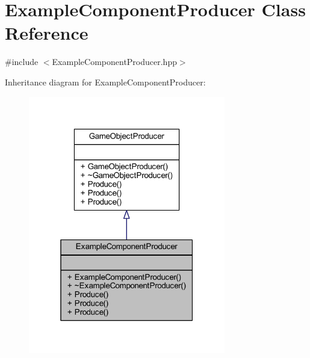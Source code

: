 \hypertarget{class_example_component_producer}{\section{Example\-Component\-Producer Class Reference}
\label{class_example_component_producer}
}


{\ttfamily \#include $<$Example\-Component\-Producer.\-hpp$>$}



Inheritance diagram for Example\-Component\-Producer\-:\nopagebreak
\begin{figure}[H]
\begin{center}
\leavevmode
\includegraphics[width=244pt]{class_example_component_producer__inherit__graph}
\end{center}
\end{figure}


